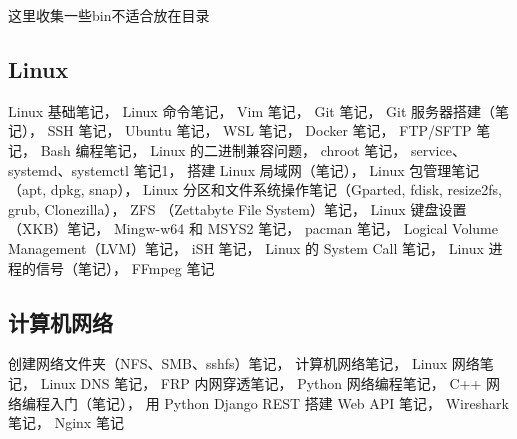 
这里收集一些bin不适合放在目录

\subsection{Linux}
Linux 基础笔记，
Linux 命令笔记，
Vim 笔记，
Git 笔记，
Git 服务器搭建（笔记），
SSH 笔记，
Ubuntu 笔记，
WSL 笔记，
Docker 笔记，
FTP/SFTP 笔记，
Bash 编程笔记，
Linux 的二进制兼容问题，
chroot 笔记，
service、systemd、systemctl 笔记1，
搭建 Linux 局域网（笔记），
Linux 包管理笔记（apt, dpkg, snap），
Linux 分区和文件系统操作笔记（Gparted, fdisk, resize2fs, grub, Clonezilla），
ZFS （Zettabyte File System）笔记，
Linux 键盘设置（XKB）笔记，
Mingw-w64 和 MSYS2 笔记，
pacman 笔记，
Logical Volume Management（LVM）笔记，
iSH 笔记，
Linux 的 System Call 笔记，
Linux 进程的信号（笔记），
FFmpeg 笔记

\subsection{计算机网络}
创建网络文件夹（NFS、SMB、sshfs）笔记，
计算机网络笔记，
Linux 网络笔记，
Linux DNS 笔记，
FRP 内网穿透笔记，
Python 网络编程笔记，
C++ 网络编程入门（笔记），
用 Python Django REST 搭建 Web API 笔记，
Wireshark 笔记，
Nginx 笔记

